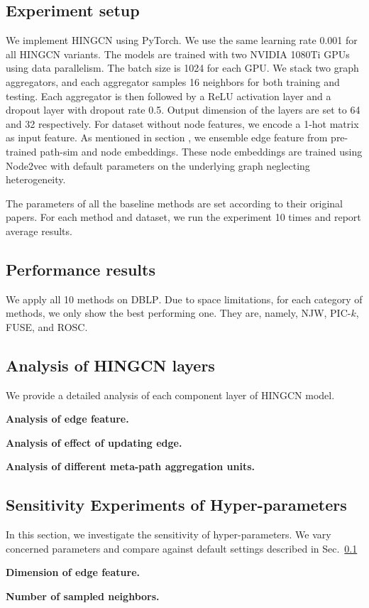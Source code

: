 \subsection{Experiment setup}
\label{sec:setup}
We implement HINGCN using PyTorch. We use the same learning rate 0.001 for all HINGCN variants. The models  are trained with two NVIDIA 1080Ti GPUs using data parallelism. The batch size is 1024 for each GPU. We stack two graph aggregators, and each aggregator samples 16 neighbors for both training and testing. Each aggregator is then followed by a ReLU activation layer and a dropout layer with dropout rate 0.5. Output dimension of the layers are set to 64 and 32 respectively. For dataset without node features, we encode a 1-hot matrix as input feature. As mentioned in section , we ensemble edge feature from pre-trained path-sim and node embeddings. These node embeddings are trained using Node2vec with default parameters on the underlying graph neglecting heterogeneity.

The parameters of all the baseline methods are set according to their original papers.
For each method and dataset,
we run the experiment 10 times and report average results.

\subsection{Performance results}
\label{sec:results}

We apply all 10 methods on \textsc{DBLP}. 
Due to space limitations, for each category of methods, we only show the best performing one. 
They are, namely, NJW, PIC-$k$, FUSE, and ROSC. 

\subsection{Analysis of HINGCN layers}
We provide a detailed analysis of each component layer of HINGCN model.

\textbf{Analysis of edge feature.}

\textbf{Analysis of effect of updating edge.}

\textbf{Analysis of different meta-path aggregation units.}

\subsection{Sensitivity Experiments of Hyper-parameters}
In this section, we investigate the sensitivity of hyper-parameters. We vary concerned parameters and compare against default settings described in Sec.~\ref{sec:setup} 

\textbf{Dimension of edge feature.}

\textbf{Number of sampled neighbors.}






